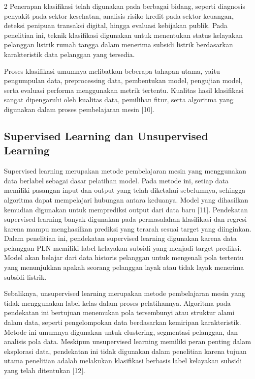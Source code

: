 \documentclass[12pt, a4paper, onecolumn, oneside]{report}
\begin{document}
\begin{spacing}{2}
Penerapan klasifikasi telah digunakan pada berbagai bidang, seperti diagnosis penyakit pada sektor kesehatan, analisis risiko kredit pada sektor keuangan, deteksi penipuan transaksi digital, hingga evaluasi kebijakan publik. Pada penelitian ini, teknik klasifikasi digunakan untuk menentukan status kelayakan pelanggan listrik rumah tangga dalam menerima subsidi listrik berdasarkan karakteristik data pelanggan yang tersedia.

Proses klasifikasi umumnya melibatkan beberapa tahapan utama, yaitu pengumpulan data, preprocessing data, pembentukan model, pengujian model, serta evaluasi performa menggunakan metrik tertentu. Kualitas hasil klasifikasi sangat dipengaruhi oleh kualitas data, pemilihan fitur, serta algoritma yang digunakan dalam proses pembelajaran mesin [10].

\subsection{Supervised Learning dan Unsupervised Learning}
Supervised learning merupakan metode pembelajaran mesin yang menggunakan data berlabel sebagai dasar pelatihan model. Pada metode ini, setiap data memiliki pasangan input dan output yang telah diketahui sebelumnya, sehingga algoritma dapat mempelajari hubungan antara keduanya. Model yang dihasilkan kemudian digunakan untuk memprediksi output dari data baru [11]. Pendekatan supervised learning banyak digunakan pada permasalahan klasifikasi dan regresi karena mampu menghasilkan prediksi yang terarah sesuai target yang diinginkan. Dalam penelitian ini, pendekatan supervised learning digunakan karena data pelanggan PLN memiliki label kelayakan subsidi yang menjadi target prediksi. Model akan belajar dari data historis pelanggan untuk mengenali pola tertentu yang menunjukkan apakah seorang pelanggan layak atau tidak layak menerima subsidi listrik.

Sebaliknya, unsupervised learning merupakan metode pembelajaran mesin yang tidak menggunakan label kelas dalam proses pelatihannya. Algoritma pada pendekatan ini bertujuan menemukan pola tersembunyi atau struktur alami dalam data, seperti pengelompokan data berdasarkan kemiripan karakteristik. Metode ini umumnya digunakan untuk clustering, segmentasi pelanggan, dan analisis pola data. Meskipun unsupervised learning memiliki peran penting dalam eksplorasi data, pendekatan ini tidak digunakan dalam penelitian karena tujuan utama penelitian adalah melakukan klasifikasi berbasis label kelayakan subsidi yang telah ditentukan [12].


\end{spacing}
\end{document}

